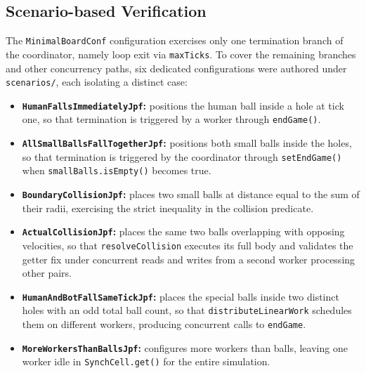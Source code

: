 \documentclass{scrartcl}
\begin{document}
\subsection{Scenario-based Verification}

The \texttt{MinimalBoardConf} configuration exercises only one termination branch of the coordinator, namely loop exit via \texttt{maxTicks}. To cover the remaining branches and other concurrency paths, six dedicated configurations were authored under \texttt{scenarios/}, each isolating a distinct case:

\begin{itemize}
    \item \textbf{\texttt{HumanFallsImmediatelyJpf}:} positions the human ball inside a hole at tick one, so that termination is triggered by a worker through \texttt{endGame()}.
    \item \textbf{\texttt{AllSmallBallsFallTogetherJpf}:} positions both small balls inside the holes, so that termination is triggered by the coordinator through \texttt{setEndGame()} when \texttt{smallBalls.isEmpty()} becomes true.
    \item \textbf{\texttt{BoundaryCollisionJpf}:} places two small balls at distance equal to the sum of their radii, exercising the strict inequality in the collision predicate.
    \item \textbf{\texttt{ActualCollisionJpf}:} places the same two balls overlapping with opposing velocities, so that \texttt{resolveCollision} executes its full body and validates the getter fix under concurrent reads and writes from a second worker processing other pairs.
    \item \textbf{\texttt{HumanAndBotFallSameTickJpf}:} places the special balls inside two distinct holes with an odd total ball count, so that \texttt{distributeLinearWork} schedules them on different workers, producing concurrent calls to \texttt{endGame}.
    \item \textbf{\texttt{MoreWorkersThanBallsJpf}:} configures more workers than balls, leaving one worker idle in \texttt{SynchCell.get()} for the entire simulation.
\end{itemize}
\end{document}
